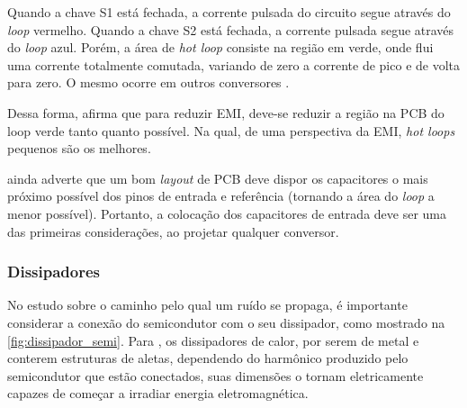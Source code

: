             Quando a chave S1 está fechada, a corrente pulsada do circuito segue através do \textit{loop} vermelho. Quando a chave S2 está fechada, a corrente pulsada segue através do \textit{loop} azul. Porém, a área de \textit{hot loop} consiste na região em verde, onde flui uma corrente totalmente comutada, variando de zero a corrente de pico e de volta para zero. O mesmo ocorre em outros conversores \cite{ref:EMC_HotLoop_kueck}. 
            
            Dessa forma,  afirma que para reduzir EMI, deve-se reduzir a região na PCB do loop verde tanto quanto possível. Na qual, de uma perspectiva da EMI, \textit{hot loops} pequenos são os melhores.
            
             ainda adverte que um bom \textit{layout} de PCB deve dispor os capacitores o mais próximo possível dos pinos de entrada e referência (tornando a área do \textit{loop} a menor possível). Portanto, a colocação dos capacitores de entrada deve ser uma das primeiras considerações, ao projetar qualquer conversor.
            
            \subsubsection{Dissipadores} \label{cap:fund_emc_conv_mitig_dissip}
            
            No estudo sobre o caminho pelo qual um ruído se propaga, é importante considerar a conexão do semicondutor com o seu dissipador, como mostrado na \autoref{fig:dissipador_semi}. Para , os dissipadores de calor, por serem de metal e conterem estruturas de aletas, dependendo do harmônico produzido pelo semicondutor que estão conectados, suas dimensões o tornam eletricamente capazes de começar a irradiar energia eletromagnética. 
            
